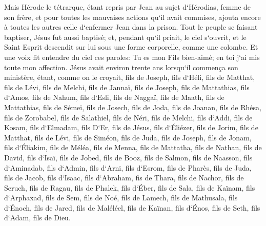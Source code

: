 \verse Mais Hérode le tétrarque, étant repris par Jean au sujet d`Hérodias, femme de son frère, et pour toutes les mauvaises actions qu`il avait commises, 
\verse ajouta encore à toutes les autres celle d`enfermer Jean dans la prison. 
\verse Tout le peuple se faisant baptiser, Jésus fut aussi baptisé; et, pendant qu`il priait, le ciel s`ouvrit, 
\verse et le Saint Esprit descendit sur lui sous une forme corporelle, comme une colombe. Et une voix fit entendre du ciel ces paroles: Tu es mon Fils bien-aimé; en toi j`ai mis toute mon affection. 
\verse Jésus avait environ trente ans lorsqu`il commença son ministère, étant, comme on le croyait, fils de Joseph, fils d`Héli, 
\verse fils de Matthat, fils de Lévi, fils de Melchi, fils de Jannaï, fils de Joseph, 
\verse fils de Mattathias, fils d`Amos, fils de Nahum, fils d`Esli, fils de Naggaï, 
\verse fils de Maath, fils de Mattathias, fils de Sémeï, fils de Josech, fils de Joda, 
\verse fils de Joanan, fils de Rhésa, fils de Zorobabel, fils de Salathiel, fils de Néri, 
\verse fils de Melchi, fils d`Addi, fils de Kosam, fils d`Elmadam, fils D`Er, 
\verse fils de Jésus, fils d`Éliézer, fils de Jorim, fils de Matthat, fils de Lévi, 
\verse fils de Siméon, fils de Juda, fils de Joseph, fils de Jonam, fils d`Éliakim, 
\verse fils de Méléa, fils de Menna, fils de Mattatha, fils de Nathan, fils de David, 
\verse fils d`Isaï, fils de Jobed, fils de Booz, fils de Salmon, fils de Naasson, 
\verse fils d`Aminadab, fils d`Admin, fils d`Arni, fils d`Esrom, fils de Pharès, fils de Juda, 
\verse fils de Jacob, fils d`Isaac, fils d`Abraham, fis de Thara, fils de Nachor, 
\verse fils de Seruch, fils de Ragau, fils de Phalek, fils d`Éber, fils de Sala, 
\verse fils de Kaïnam, fils d`Arphaxad, fils de Sem, fils de Noé, fils de Lamech, 
\verse fils de Mathusala, fils d`Énoch, fils de Jared, fils de Maléléel, fils de Kaïnan, 
\verse fils d`Énos, fils de Seth, fils d`Adam, fils de Dieu. 

\chapter{}

